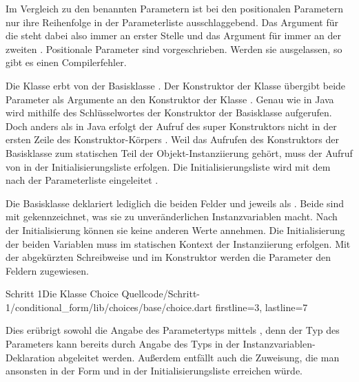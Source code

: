 Im Vergleich zu den benannten Parametern ist bei den positionalen Parametern nur ihre Reihenfolge in der Parameterliste ausschlaggebend.
Das Argument für die  steht dabei also immer an erster Stelle und das Argument für  immer an der zweiten .
Positionale Parameter sind vorgeschrieben.
Werden sie ausgelassen, so gibt es einen Compilerfehler.

Die Klasse  erbt von der Basisklasse  .
Der Konstruktor der Klasse  übergibt beide Parameter als Argumente an den Konstruktor der Klasse .
Genau wie in Java wird mithilfe des Schlüsselwortes  der Konstruktor der Basisklasse aufgerufen.
Doch anders als in Java erfolgt der Aufruf des super Konstruktors nicht in der ersten Zeile des Konstruktor-Körpers .
Weil das Aufrufen des Konstruktors der Basisklasse zum statischen Teil der Objekt-Instanziierung gehört, muss der Aufruf von  in der Initialisierungsliste erfolgen.
Die Initialisierungsliste wird mit dem \IC{:} nach der Parameterliste eingeleitet .

Die Basisklasse  \Lst{\ref{lst:Schritt1KlasseChoice}} deklariert lediglich die beiden Felder  und  jeweils als  .
Beide sind mit  gekennzeichnet, was sie zu unveränderlichen Instanzvariablen macht.
Nach der Initialisierung können sie keine anderen Werte annehmen.
 Die Initialisierung der beiden Variablen muss im statischen Kontext der Instanziierung erfolgen.
Mit der abgekürzten Schreibweise  und   im Konstruktor  werden die Parameter den Feldern zugewiesen.

\begin{alexlisting}{Schritt 1}{Die Klasse Choice}
  {Quellcode/Schritt-1/conditional_form/lib/choices/base/choice.dart}
  {firstline=3, lastline=7}
  \label{lst:Schritt1KlasseChoice}
\end{alexlisting}

Dies erübrigt sowohl die Angabe des Parametertyps mittels , denn der Typ des Parameters kann bereits durch Angabe des Typs in der Instanzvariablen-Deklaration abgeleitet werden.
Außerdem entfällt auch die Zuweisung, die man ansonsten in der Form  und  in der Initialisierungsliste erreichen würde.


